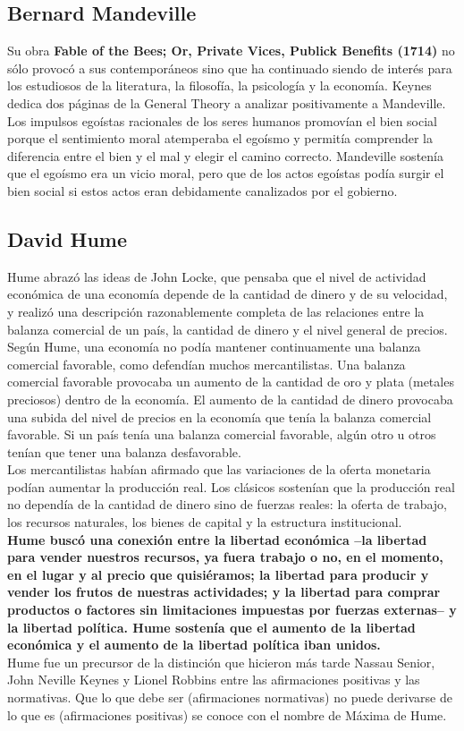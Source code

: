\documentclass[10pt]{book}
\begin{document}
\subsection*{Bernard Mandeville}
Su obra \textbf{Fable of the Bees; Or, Private Vices, Publick Benefits (1714)} no sólo provocó a sus contemporáneos sino que ha continuado siendo de interés para los estudiosos de la literatura, la filosofía, la psicología y la economía. Keynes dedica dos páginas de la General Theory a analizar positivamente a Mandeville.\\
Los impulsos egoístas racionales de los seres humanos promovían el bien social porque el sentimiento moral atemperaba el egoísmo y permitía comprender la diferencia entre el bien y el mal y elegir el camino correcto. Mandeville sostenía que el egoísmo era un vicio moral, pero que de los actos egoístas podía surgir el bien social si estos actos eran debidamente canalizados por el gobierno.\\

\subsection*{David Hume}
Hume abrazó las ideas de John Locke, que pensaba que el nivel de actividad económica de una economía depende de la cantidad de dinero y de su velocidad, y realizó una descripción razonablemente completa de las relaciones entre la balanza comercial de un país, la cantidad de dinero y el nivel general de precios.\\
Según Hume, una economía no podía mantener continuamente una balanza comercial favorable, como defendían muchos mercantilistas. Una balanza comercial favorable provocaba un aumento de la cantidad de oro y plata (metales preciosos) dentro de la economía. El aumento de la cantidad de dinero provocaba una subida del nivel de precios en la economía que tenía la balanza comercial favorable. Si un país tenía una balanza comercial favorable, algún otro u otros tenían que tener una balanza desfavorable.\\
Los mercantilistas habían afirmado que las variaciones de la oferta monetaria podían aumentar la producción real. Los clásicos sostenían que la producción real no dependía de la cantidad de dinero sino de fuerzas reales: la oferta de trabajo, los recursos naturales, los bienes de capital y la estructura institucional.\\
\textbf{Hume buscó una conexión entre la libertad económica –la libertad para vender nuestros recursos, ya fuera trabajo o no, en el momento, en el lugar y al precio que quisiéramos; la libertad para producir y vender los frutos de nuestras actividades; y la libertad para comprar productos o factores sin limitaciones impuestas por fuerzas externas– y la libertad política. Hume sostenía que el aumento de la libertad económica y el aumento de la libertad política iban unidos.}\\
Hume fue un precursor de la distinción que hicieron más tarde Nassau Senior, John Neville Keynes y Lionel Robbins entre las afirmaciones positivas y las normativas. Que lo que debe ser (afirmaciones normativas) no puede derivarse de lo que es (afirmaciones positivas) se conoce con el nombre de Máxima de Hume.
\end{document}
